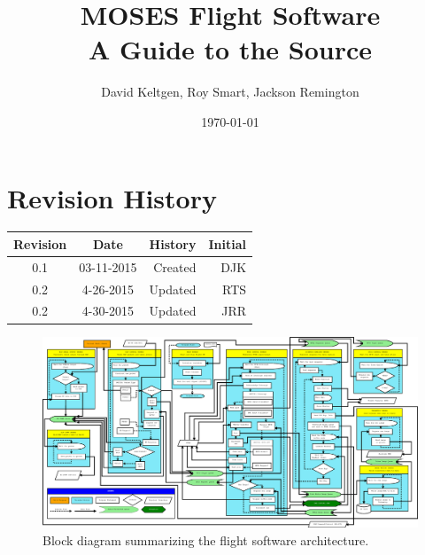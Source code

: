 \documentclass[11pt,titlepage]{article}
\title{MOSES Flight Software \\ A Guide to the Source}
\author{David Keltgen, Roy Smart, Jackson Remington}
\date{\today}
\begin{document}
\maketitle
\tableofcontents
\newpage

\section[Revisions]{Revision History}
	\begin{longtable}{|c|c|r|r|}
		\hline
		Revision	&	Date	&	\multicolumn{1}{c|}{History}	&	\multicolumn{1}{c|}{Initial}\\
		\hline
		0.1	&	03-11-2015	&	Created	& DJK	\\
		\hline
		0.2 & 4-26-2015 & Updated & RTS \\
		\hline
		0.2 & 4-30-2015 & Updated & JRR \\
		\hline

	\end{longtable}
	
\newpage






\begin{landscape}
\begin{figure}[h!]
\centering
\includegraphics[width=24.5cm]{images/mfsw_block}
\caption{Block diagram summarizing the flight software architecture.}
\end{figure}
\end{landscape}








\end{document}
